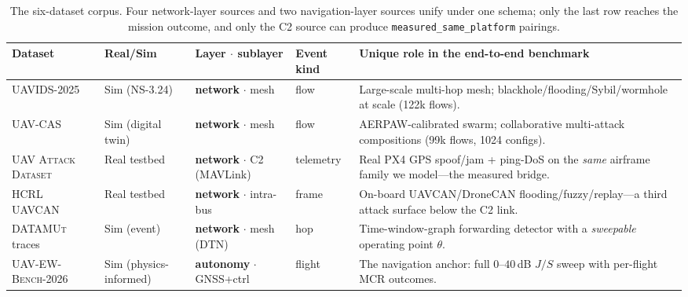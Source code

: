 \documentclass[conference]{IEEEtran}
\newcommand{\layernet}{\textcolor{netcol}{\textbf{network}}}
\newcommand{\layerauto}{\textcolor{autocol}{\textbf{autonomy}}}
\newcommand{\dataset}[1]{\textsc{#1}}
\newcommand{\code}[1]{\texttt{#1}}
\begin{document}
\begin{table}[t]
\centering
\caption{The six-dataset corpus. Four network-layer sources and two
navigation-layer sources unify under one schema; only the last row reaches the
mission outcome, and only the C2 source can produce \code{measured\_same\_platform}
pairings.}
\label{tab:corpus}
\small
\renewcommand{\arraystretch}{1.25}
\begin{tabularx}{\textwidth}{@{}l l l l X@{}}
\toprule
\textbf{Dataset} & \textbf{Real/Sim} & \textbf{Layer $\cdot$ sublayer} & \textbf{Event kind} & \textbf{Unique role in the end-to-end benchmark}\\
\midrule
\dataset{UAVIDS-2025}~\cite{uavids2025} & Sim (NS-3.24) & \layernet{} $\cdot$ mesh & flow & Large-scale multi-hop mesh; blackhole/flooding/Sybil/wormhole at scale (122k flows).\\
\dataset{UAV-CAS}~\cite{uavcas2026} & Sim (digital twin) & \layernet{} $\cdot$ mesh & flow & AERPAW-calibrated swarm; collaborative multi-attack compositions (99k flows, 1024 configs).\\
\dataset{UAV Attack Dataset}~\cite{whelan2020uav} & Real testbed & \layernet{} $\cdot$ C2 (MAVLink) & telemetry & Real PX4 GPS spoof/jam + ping-DoS on the \emph{same} airframe family we model---the measured bridge.\\
\dataset{HCRL UAVCAN}~\cite{hcrl_uavcan} & Real testbed & \layernet{} $\cdot$ intra-bus & frame & On-board UAVCAN/DroneCAN flooding/fuzzy/replay---a third attack surface below the C2 link.\\
\dataset{DATAMUt} traces~\cite{datamut2026} & Sim (event) & \layernet{} $\cdot$ mesh (DTN) & hop & Time-window-graph forwarding detector with a \emph{sweepable} operating point $\theta$.\\
\dataset{UAV-EW-Bench-2026}~\cite{uavewbench2026} & Sim (physics-informed) & \layerauto{} $\cdot$ GNSS+ctrl & flight & The navigation anchor: full $0$--$40$\,dB $J/S$ sweep with per-flight MCR outcomes.\\
\bottomrule
\end{tabularx}
\end{table}
\end{document}
